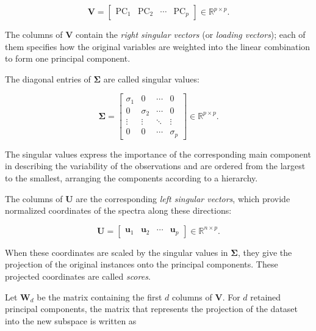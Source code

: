 \begin{equation}
    \mathbf{V} =
    \begin{bmatrix}
    \mathrm{PC}_1 & \mathrm{PC}_2 & \cdots & \mathrm{PC}_p
    \end{bmatrix}
    \in \mathbb{R}^{p \times p}.
    \label{eq:pca_v_matrix}
\end{equation}

The columns of \(\mathbf{V}\) contain the \textit{right singular vectors} (or \textit{loading vectors}); each of them specifies how the original variables are weighted into the linear combination to form one principal component.

The diagonal entries of \(\boldsymbol{\Sigma}\) are called singular values:

\begin{equation}
    \boldsymbol{\Sigma} =
    \begin{bmatrix}
    \sigma_1 & 0 & \cdots & 0 \\
    0 & \sigma_2 & \cdots & 0 \\
    \vdots & \vdots & \ddots & \vdots \\
    0 & 0 & \cdots & \sigma_p
    \end{bmatrix}
    \in \mathbb{R}^{p \times p}.
    \label{eq:pca_sigma_matrix}
\end{equation}

The singular values express the importance of the corresponding main component in describing the variability of the observations and are ordered from the largest to the smallest, arranging the components according to a hierarchy.

The columns of \(\mathbf{U}\) are the corresponding \textit{left singular vectors}, which provide normalized coordinates of the spectra along these directions:

\begin{equation}
    \mathbf{U} =
    \begin{bmatrix}
    \mathbf{u}_1 & \mathbf{u}_2 & \cdots & \mathbf{u}_p
    \end{bmatrix}
    \in \mathbb{R}^{n \times p}.
    \label{eq:pca_u_matrix}
\end{equation}

When these coordinates are scaled by the singular values in \(\boldsymbol{\Sigma}\), they give the projection of the original instances onto the principal components. These projected coordinates are called \textit{scores}.

Let \(\mathbf{W}_d\) be the matrix containing the first \(d\) columns of \(\mathbf{V}\). For \(d\) retained principal components, the matrix that represents the projection of the dataset into the new subspace is written as

